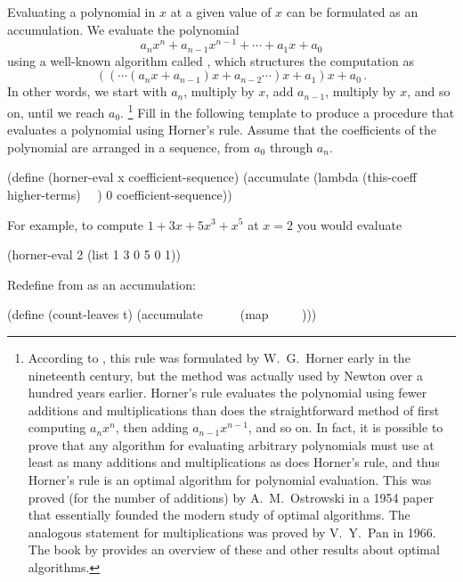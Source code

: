 \begin{exercise}
	\label{Exercise 2.34}
	Evaluating a polynomial in \( x \) at a given value of \( x \) can be formulated as an accumulation.
	We evaluate the polynomial
	\[
		a_n x^n + a_{n-1} x^{n-1} + \dotsb + a_1 x + a_0
	\]
	using a well-known algorithm called , which structures
	the computation as
	\[
		(( \dotsm (a_n x + a_{n - 1}) x + a_{n - 2} \dotsm )x + a_1) x + a_0 \,.
	\]
	In other words, we start with \( a_n \), multiply by \( x \), add \( a_{n-1} \), multiply by \( x \), and so on, until we reach \( a_0 \).%
	\footnote{
		According to , this rule was formulated by W.~G.~Horner early in the nineteenth century, but the method was actually used by Newton over a hundred years earlier.
		Horner’s rule evaluates the polynomial using fewer additions and multiplications than does the straightforward method of first computing \( a_n x^n \), then adding \( a_{n-1} x^{n-1} \), and so on.
		In fact, it is possible to prove that any algorithm for evaluating arbitrary polynomials must use at least as many additions and multiplications as does Horner’s rule, and thus Horner’s rule is an optimal algorithm for polynomial evaluation.
		This was proved (for the number of additions) by A.~M.~Ostrowski in a 1954 paper that essentially founded the modern study of optimal algorithms.
		The analogous statement for multiplications was proved by V.~Y.~Pan in 1966.
		The book by  provides an overview of these and other results about optimal algorithms.
	}
	Fill in the following template to produce a procedure that evaluates a polynomial using Horner’s rule.
	Assume that the coefficients of the polynomial are arranged in a sequence, from \( a_0 \) through \( a_n \).
	\begin{scheme}
	  (define (horner-eval x coefficient-sequence)
	    (accumulate (lambda (this-coeff higher-terms) ~~)
	                0
	                coefficient-sequence))
	\end{scheme}
	For example, to compute \( 1 + 3 x + 5 x^3 + x^5 \) at \( x = 2 \) you would evaluate
	\begin{scheme}
	  (horner-eval 2 (list 1 3 0 5 0 1))
	\end{scheme}
\end{exercise}



\begin{exercise}
	\label{Exercise 2.35}
	Redefine  from  as an accumulation:
	\begin{scheme}
	  (define (count-leaves t)
	    (accumulate ~~ ~~ (map ~~ ~~)))
	\end{scheme}
\end{exercise}



